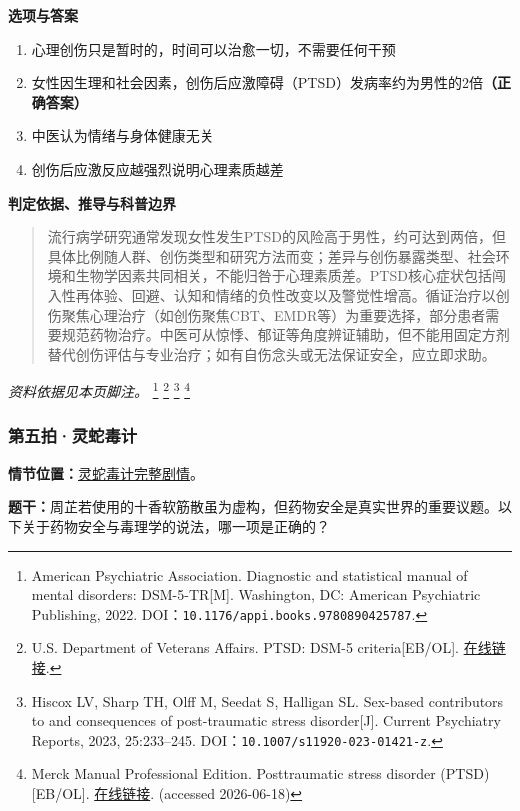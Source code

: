 \textbf{选项与答案}
\begin{enumerate}[label=\Alph*.,leftmargin=*]
  \item 心理创伤只是暂时的，时间可以治愈一切，不需要任何干预
  \item 女性因生理和社会因素，创伤后应激障碍（PTSD）发病率约为男性的2倍\textbf{（正确答案）}
  \item 中医认为情绪与身体健康无关
  \item 创伤后应激反应越强烈说明心理素质越差
\end{enumerate}
\textbf{判定依据、推导与科普边界}
\begin{quote}流行病学研究通常发现女性发生PTSD的风险高于男性，约可达到两倍，但具体比例随人群、创伤类型和研究方法而变；差异与创伤暴露类型、社会环境和生物学因素共同相关，不能归咎于心理素质差。PTSD核心症状包括闯入性再体验、回避、认知和情绪的负性改变以及警觉性增高。循证治疗以创伤聚焦心理治疗（如创伤聚焦CBT、EMDR等）为重要选择，部分患者需要规范药物治疗。中医可从惊悸、郁证等角度辨证辅助，但不能用固定方剂替代创伤评估与专业治疗；如有自伤念头或无法保证安全，应立即求助。\end{quote}
\noindent\textit{资料依据见本页脚注。}
\footnote{American Psychiatric Association. Diagnostic and statistical manual of mental disorders: DSM-5-TR[M]. Washington, DC: American Psychiatric Publishing, 2022. DOI：\nolinkurl{10.1176/appi.books.9780890425787}.}
\footnote{U.S. Department of Veterans Affairs. PTSD: DSM-5 criteria[EB/OL]. \href{https://www.ptsd.va.gov/professional/treat/essentials/dsm5_ptsd.asp}{在线链接}.}
\footnote{Hiscox LV, Sharp TH, Olff M, Seedat S, Halligan SL. Sex-based contributors to and consequences of post-traumatic stress disorder[J]. Current Psychiatry Reports, 2023, 25:233–245. DOI：\nolinkurl{10.1007/s11920-023-01421-z}.}
\footnote{Merck Manual Professional Edition. Posttraumatic stress disorder (PTSD)[EB/OL]. \href{https://www.merckmanuals.com/professional/psychiatric-disorders/anxiety-and-trauma-and-stressor-related-disorders/posttraumatic-stress-disorder-ptsd}{在线链接}. (accessed 2026-06-18)}

\subsubsection{第五拍·灵蛇毒计}\label{question:zhouzhiruo:5}
\textbf{情节位置：}\hyperref[plot:zhouzhiruo:5]{灵蛇毒计完整剧情}。

\textbf{题干：}周芷若使用的十香软筋散虽为虚构，但药物安全是真实世界的重要议题。以下关于药物安全与毒理学的说法，哪一项是正确的？

